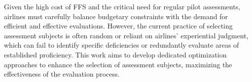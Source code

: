 \documentclass[opre,sglanonrev]{informs4}
\begin{document}

Given the high cost of FFS and the critical need for regular pilot assessments, airlines must carefully balance budgetary constraints with the demand for efficient and effective evaluations. However, the current practice of selecting assessment subjects is often random or reliant on airlines' experiential judgment, which can fail to identify specific deficiencies or redundantly evaluate areas of established proficiency. This work aims to develop dedicated optimization approaches to enhance the selection of assessment subjects, maximizing the effectiveness of the evaluation process.
\end{document}
